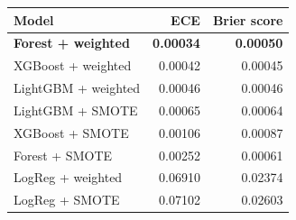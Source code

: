 \begin{tabular}{l r r}
\hline
\textbf{Model} & \textbf{ECE} & \textbf{Brier score} \\
\hline
\textbf{Forest + weighted} & \textbf{0.00034} & \textbf{0.00050} \\
XGBoost + weighted & 0.00042 & 0.00045 \\
LightGBM + weighted & 0.00046 & 0.00046 \\
LightGBM + SMOTE & 0.00065 & 0.00064 \\
XGBoost + SMOTE & 0.00106 & 0.00087 \\
Forest + SMOTE & 0.00252 & 0.00061 \\
LogReg + weighted & 0.06910 & 0.02374 \\
LogReg + SMOTE & 0.07102 & 0.02603 \\
\hline
\end{tabular}